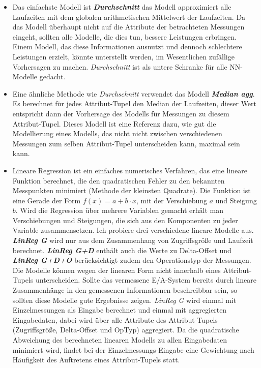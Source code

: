 \documentclass[
	12pt,
	a4paper,
	BCOR10mm,
	DIV14,
	listof=totoc,
	bibliography=totoc,
	headsepline
]{scrreprt}
\begin{document}
\begin{itemize}
	\item Das einfachste Modell ist \textit{\textbf{Durchschnitt}} das Modell approximiert alle Laufzeiten mit dem globalen arithmetischen Mittelwert der Laufzeiten.
Da das Modell überhaupt nicht auf die Attribute der betrachteten Messungen eingeht, sollten alle Modelle, die dies tun, bessere Leistungen erbringen. Einem Modell, das diese Informationen ausnutzt und dennoch schlechtere Leistungen erzielt, könnte unterstellt werden, im Wesentlichen zufällige Vorhersagen zu machen.
\textit{Durchschnitt} ist als untere Schranke für alle NN-Modelle gedacht.
	\item Eine ähnliche Methode wie \textit{Durchschnitt} verwendet das Modell \textit{\textbf{Median agg}}. Es berechnet für jedes Attribut-Tupel den Median der Laufzeiten, dieser Wert entspricht dann der Vorhersage des Modells für Messungen zu diesem Attribut-Tupel.
Dieses Modell ist eine Referenz dazu, wie gut die Modellierung eines Modells, das nicht nicht zwischen verschiedenen Messungen zum selben Attribut-Tupel unterscheiden kann, maximal sein kann.
	\item Lineare Regression ist ein einfaches numerisches Verfahren, das eine lineare Funktion berechnet, die den quadratischen Fehler zu den bekannten Messpunkten minimiert (Methode der kleinsten Quadrate).
Die Funktion ist eine Gerade der Form $f(x) = a + b \cdot x$, mit der Verschiebung $a$ und Steigung $b$. Wird die Regression über mehrere Variablen gemacht erhält man Verschiebungen und Steigungen, die sich aus den Komponenten zu jeder Variable zusammensetzen.
Ich probiere drei verschiedene lineare Modelle aus.
\textit{\textbf{LinReg G}} wird nur aus dem Zusammenhang von Zugriffsgröße und Laufzeit berechnet.
\textit{\textbf{LinReg G+D}} enthält auch die Werte zu Delta-Offset und \textit{\textbf{LinReg G+D+O}} berücksichtigt zudem den Operationstyp der Messungen.
Die Modelle können wegen der linearen Form nicht innerhalb eines Attribut-Tupels unterscheiden. Sollte das vermessene E/A-System bereits durch lineare Zusammenhänge in den gemessenen Informationen beschreibbar sein, so sollten diese Modelle gute Ergebnisse zeigen.
\textit{LinReg G} wird einmal mit Einzelmessungen als Eingabe berechnet und einmal mit aggregierten Eingabedaten, dabei wird über alle Attribute des Attribut-Tupels (Zugriffsgröße, Delta-Offset und OpTyp) aggregiert. 
Da die quadratische Abweichung des berechneten linearen Modells zu allen Eingabedaten minimiert wird, findet bei der Einzelmessungs-Eingabe eine Gewichtung nach Häufigkeit des Auftretens eines Attribut-Tupels statt.

\end{itemize}
\end{document}
